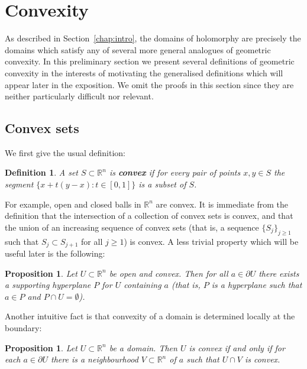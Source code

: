 \documentclass[11pt,a4paper, final, twoside]{article}
\newtheorem{definition}[theorem]{Definition}
\newtheorem{proposition}[theorem]{Proposition}
\numberwithin{equation}{section}
\newcommand{\R}{\mathbb R}
\newcommand{\bd}{\partial}
\begin{document}
\section{Convexity}
\label{chap:convexity}
As described in Section~\ref{chap:intro}, the domains of holomorphy are precisely the domains
which satisfy any of several more general analogues of geometric convexity. 
In this preliminary section we present
several definitions of geometric convexity in the interests of motivating the generalised definitions which will appear later in the exposition. We omit the proofs in this section since they
are neither particularly difficult nor relevant.
\subsection{Convex sets}
We first give the usual definition:
\begin{definition}
A set $S\subset\R^n$ is \textbf{convex} if for every pair of points $x,y\in S$ the segment $\{x+t(y-x)\colon t\in [0,1]\}$ is a subset of $S$.
\end{definition}
For example, open and closed balls in $\R^n$ are convex. It is immediate from the definition that the intersection of a collection of convex sets is convex, and that the union of an increasing sequence
of convex sets (that is, a sequence $\{S_j\}_{j\geq 1}$ such that $S_j\subset S_{j+1}$ for all $j\geq 1$) is convex. 
A less trivial property which will be useful later is the following:
\begin{proposition}
\label{suphyp}
Let $U\subset\R^n$ be open and convex. Then for all $a\in\bd U$ there exists a supporting hyperplane $P$ for $U$ containing $a$ (that is, $P$ is a hyperplane such that $a\in P$ and $P\cap U=\emptyset$).
\end{proposition}
Another intuitive fact is that convexity of a domain is determined locally at the boundary:
\begin{proposition}
\label{conlocal}
Let $U\subset\R^n$ be a domain. Then $U$ is convex if and only if for each $a\in\bd U$ there is a neighbourhood $V\subset\R^n$ of $a$ such that $U\cap V$ is convex.
\end{proposition}
\end{document}
